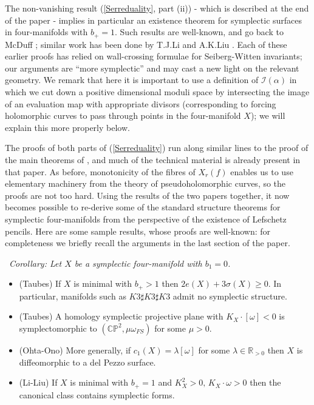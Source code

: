 \documentclass[10pt]{article}
\newcommand{\pp}{\mathbb{P}}
\newcommand{\cc}{\mathbb{C}}
\newcommand{\rr}{\mathbb{R}}
\newcounter{Universal}[section]
\renewcommand{\theUniversal}{\thesection.\arabic{Universal}}
\newenvironment{Italic}{\refstepcounter{Universal} \par \vspace{0.5cm}
\noindent {\bf (\theUniversal)}\ \it}{\par \vspace{0.5cm}}
\newenvironment{Cor}{\begin{Italic}{\sc Corollary: }}{\end{Italic}}
\begin{document}
\vspace{0.2cm}

\noindent The non-vanishing result (\ref{Serreduality}, part (ii)) -
which is described at the end of the paper - 
implies in particular an existence theorem for symplectic surfaces in
four-manifolds with $b_+ = 1$.
Such results are well-known, and go back to McDuff
\cite{McDuff:DeftoIso}; similar work has been done by T.J.Li and
A.K.Liu \cite{Li-Liu}.  Each of these earlier proofs has relied on
wall-crossing formulae for Seiberg-Witten invariants;  our
arguments are ``more symplectic'' and may
cast a new light on the relevant geometry.  We remark that here it is
important to
use a definition of $\mathcal{I}(\alpha)$ in which we
cut down a positive dimensional moduli space by intersecting the image
of an evaluation map with appropriate divisors (corresponding to
forcing holomorphic curves to pass through points in the four-manifold
$X$); we will explain this more properly below.

\vspace{0.2cm}

\noindent The proofs of both parts of (\ref{Serreduality}) run along
similar lines 
to the proof of the main theorems of \cite{SKDIS}, and much of the
technical material is already present in that paper.  As before,
monotonicity of the fibres of $X_r(f)$ enables us to use elementary
machinery from the theory of pseudoholomorphic curves, so the proofs
are not too hard.  Using the
results of the two papers together, it now becomes
possible to re-derive some of the standard structure theorems for
symplectic four-manifolds from the perspective of the existence of
Lefschetz pencils.  Here are some sample results,
whose proofs are well-known: for completeness we briefly recall the
arguments in the last section of the paper.

\begin{Cor}\label{applications}
Let $X$ be a symplectic four-manifold with $b_1 = 0$. 
\begin{itemize}
\item (Taubes) If $X$ is minimal with $b_+ > 1$ then $2e(X)+3\sigma(X) \geq
  0$.  In particular, manifolds such as $K3 \sharp K3 \sharp K3$ admit
  no symplectic structure.
\item (Taubes) A homology symplectic projective plane with $K_X \cdot
  [\omega] < 0$ 
  is symplectomorphic to $(\cc \pp^2, \mu\omega_{FS})$ for some $\mu >0$.
\item (Ohta-Ono) More generally, if $c_1 (X) = \lambda [\omega]$ for
  some $\lambda \in \rr_{>0}$ 
  then $X$ is diffeomorphic to a del Pezzo surface.  
\item (Li-Liu) If $X$ is minimal with $b_+ = 1$ and $K_X^2 > 0, \, K_X \cdot
  \omega > 0$ then the canonical class contains symplectic forms.
\end{itemize}
\end{Cor}
\end{document}
